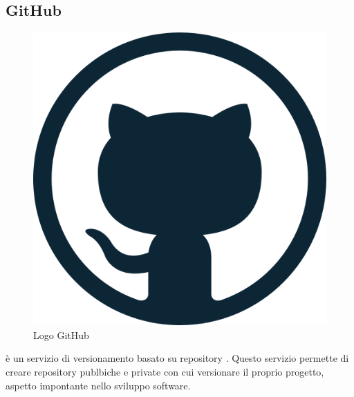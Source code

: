 \subsection{GitHub}
\begin{figure}[H]
	\begin{center} \includegraphics[scale=0.2]{figures/github-logo}
		\caption[Logo GitHub]{Logo GitHub}  
	\end{center}
\end{figure}
 è un servizio di versionamento basato su repository . Questo servizio permette di creare repository publbiche e private con cui versionare il proprio progetto, aspetto impontante nello sviluppo software.

